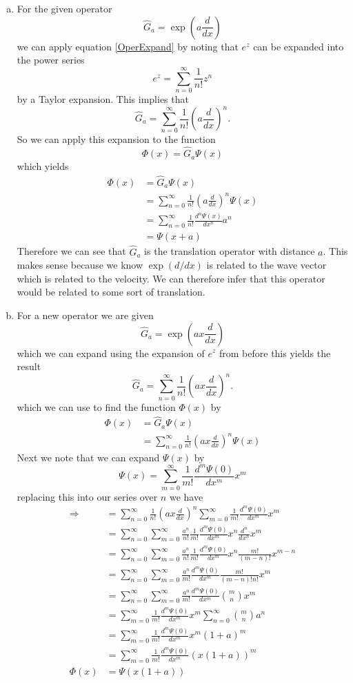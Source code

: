 \documentclass[11pt]{article}
\numberwithin{equation}{section}
\begin{document}
\begin{enumerate}[(a)]
\item For the given operator 
$$\hat{G}_a = \exp\left(a\frac{d}{dx}\right)$$
we can apply equation \ref{OperExpand} by noting that $e^{z}$ can be expanded into the power
series
$$e^z = \sum_{n=0}^{\infty}\frac{1}{n!}z^n$$
by a Taylor expansion. This implies that
$$\hat{G}_a =  \sum_{n=0}^{\infty}\frac{1}{n!}\left(a\frac{d}{dx}\right)^n.$$
So we can apply this expansion to the function
$$\Phi(x) = \hat{G}_a\Psi(x)$$
which yields
\begin{align*}
\Phi(x) &= \hat{G}_a\Psi(x)\\
&= \sum_{n=0}^{\infty}\frac{1}{n!}\left(a\frac{d}{dx}\right)^n\Psi(x)\\
&= \sum_{n=0}^{\infty}\frac{1}{n!}\frac{d^n\Psi(x)}{dx^n}a^n\\
&= \Psi(x+a)
\end{align*}
Therefore we can see that $\hat{G}_a$ is the translation operator with distance $a$. This 
makes sense because we know $\exp(d/dx)$ is related to the wave vector which is related to 
the velocity. We can therefore infer that this operator would be related to some sort of 
translation.

\item For a new operator we are given
$$\hat{G}_a = \exp\left(ax\frac{d}{dx}\right)$$
which we can expand using the expansion of $e^{z}$ from before this yields the result
$$\hat{G}_a =  \sum_{n=0}^{\infty}\frac{1}{n!}\left(ax\frac{d}{dx}\right)^n.$$
which we can use to find the function $\Phi(x)$ by
\begin{align*}
\Phi(x) &= \hat{G}_a\Psi(x)\\
&= \sum_{n=0}^{\infty}\frac{1}{n!}\left(ax\frac{d}{dx}\right)^n\Psi(x)
\end{align*}
Next we note that we can expand $\Psi(x)$ by
$$\Psi(x) = \sum_{m=0}^{\infty}\frac{1}{m!}\frac{d^m\Psi(0)}{dx^m}x^m$$
replacing this into our series over $n$ we have
\begin{align*}
\Rightarrow &= \sum_{n=0}^{\infty}\frac{1}{n!}\left(ax\frac{d}{dx}\right)^n\sum_{m=0}^{\infty}\frac{1}{m!}\frac{d^m\Psi(0)}{dx^m}x^m\\
&= \sum_{n=0}^{\infty}\sum_{m=0}^{\infty}\frac{a^n}{n!}\frac{1}{m!}\frac{d^m\Psi(0)}{dx^m}x^n\frac{d^n}{dx^n}x^m\\
&= \sum_{n=0}^{\infty}\sum_{m=0}^{\infty}\frac{a^n}{n!}\frac{1}{m!}\frac{d^m\Psi(0)}{dx^m}x^n\frac{m!}{(m-n)!}x^{m-n}\\
&= \sum_{n=0}^{\infty}\sum_{m=0}^{\infty}\frac{a^n}{m!}\frac{d^m\Psi(0)}{dx^m}\frac{m!}{(m-n)!n!}x^{m}\\
&= \sum_{n=0}^{\infty}\sum_{m=0}^{\infty}\frac{a^n}{m!}\frac{d^m\Psi(0)}{dx^m}{m\choose{n}}x^{m}\\
&= \sum_{m=0}^{\infty}\frac{1}{m!}\frac{d^m\Psi(0)}{dx^m}x^{m}\sum_{n=0}^{\infty}{m\choose n}a^n\\
&= \sum_{m=0}^{\infty}\frac{1}{m!}\frac{d^m\Psi(0)}{dx^m}x^{m}(1+a)^m\\
&= \sum_{m=0}^{\infty}\frac{1}{m!}\frac{d^m\Psi(0)}{dx^m}(x(1+a))^m\\
\Phi(x) &= \Psi(x(1+a))
\end{align*}



\end{enumerate}
\end{document}
